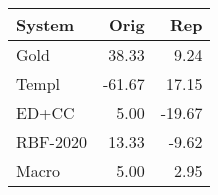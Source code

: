 \begin{tabular}{lrr}
\toprule
System & Orig & Rep \\
\midrule
Gold & 38.33 & 9.24 \\
Templ & -61.67 & 17.15 \\
ED+CC & 5.00 & -19.67 \\
RBF-2020 & 13.33 & -9.62 \\
Macro & 5.00 & 2.95 \\
\bottomrule
\end{tabular}
